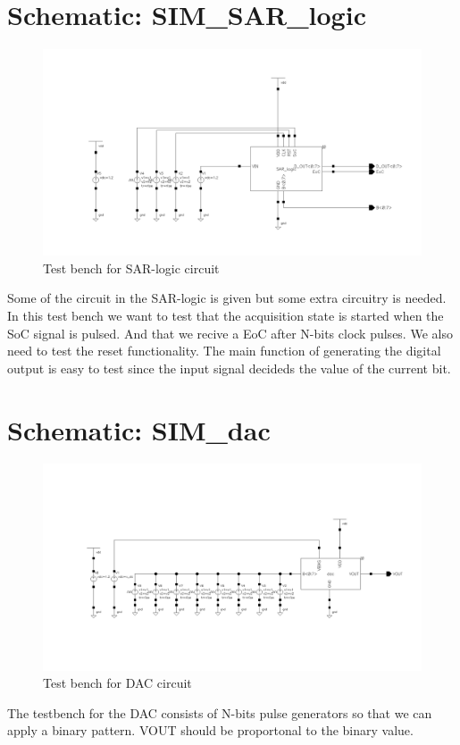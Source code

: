 \documentclass[english, a4paper,11pt]{article}
\begin{document}
\section*{Schematic: SIM\_SAR\_logic}
\begin{figure}[!ht]
 \centering
   \includegraphics[width=\textwidth]{img/SIM_SAR_logic.png}
   \caption{Test bench for SAR-logic circuit}
   \label{sim:logic}
\end{figure}
Some of the circuit in the SAR-logic is given but some extra circuitry is needed. In this test bench we want to test
that the acquisition state is started when the SoC signal is pulsed. And that we recive a EoC after N-bits clock pulses.
We also need to test the reset functionality. 
The main function of generating the digital output is easy to test since the input signal decideds the value of the current bit.


\section*{Schematic: SIM\_dac}
\begin{figure}[!ht]
 \centering
   \includegraphics[width=\textwidth]{img/SIM_dac.png}
   \caption{Test bench for DAC circuit}
   \label{sim:dac}
\end{figure}
The testbench for the DAC consists of N-bits pulse generators so that we can apply a binary pattern. 
VOUT should be proportonal to the binary value.
\end{document}
